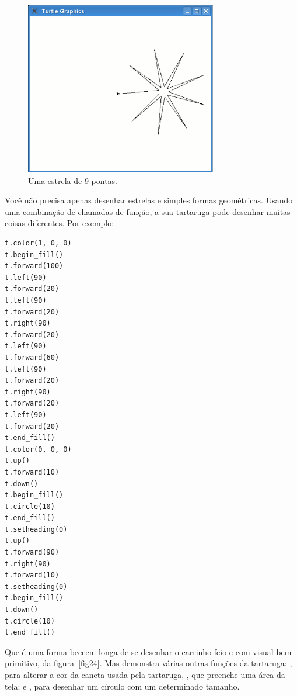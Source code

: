 \begin{figure}
\begin{center}
\includegraphics[width=84mm]{eps/figure23.eps}
\end{center}
\caption{Uma estrela de 9 pontas.}\label{fig23}
\end{figure}

Você não precisa apenas desenhar estrelas e simples formas geométricas. Usando uma combinação de chamadas de função, a sua tartaruga pode desenhar muitas coisas diferentes. Por exemplo:

\begin{listing}
\begin{verbatim}
t.color(1, 0, 0)
t.begin_fill()
t.forward(100)
t.left(90)
t.forward(20)
t.left(90)
t.forward(20)
t.right(90)
t.forward(20)
t.left(90)
t.forward(60)
t.left(90)
t.forward(20)
t.right(90)
t.forward(20)
t.left(90)
t.forward(20)
t.end_fill()
t.color(0, 0, 0)
t.up()
t.forward(10)
t.down()
t.begin_fill()
t.circle(10)
t.end_fill()
t.setheading(0)
t.up()
t.forward(90)
t.right(90)
t.forward(10)
t.setheading(0)
t.begin_fill()
t.down()
t.circle(10)
t.end_fill()
\end{verbatim}
\end{listing}

\noindent
Que é uma forma beeeem longa de se desenhar o carrinho feio e com visual bem primitivo, da figura~\ref{fig24}. Mas demonstra várias outras funções da tartaruga: , para alterar a cor da caneta usada pela tartaruga, , que preenche uma área da tela; e , para desenhar um círculo com um determinado tamanho.

